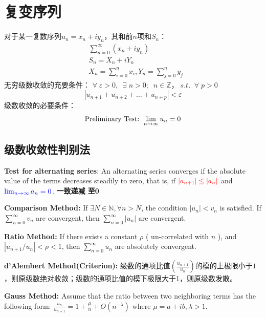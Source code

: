 \documentclass[10pt, a4paper, oneside]{ctexbook}
\begin{document}
\chapter{复变序列}
对于某一复数序列$u_n=x_n+iy_n$，其和前$n$项和$S_n$：
\begin{equation*}
    \begin{aligned}
         & \sum_{n=0}^{\infty}\left(x_{n}+i y_{n}\right)          \\
         & S_{n}=X_{n}+i Y_{n}                                    \\
         & X_{n}=\sum_{i=0}^{n} x_{i}, Y_{n}=\sum_{j=0}^{n} y_{j}
    \end{aligned}
\end{equation*}
无穷级数收敛的充要条件：
$\forall\; \varepsilon > 0,\;\; \exists\; n>0;\;\; n \in \mathbb{Z}， \; s.t.\;\; \forall \; p>0\:$
\begin{equation*}
    \left|u_{n+1}+u_{n+2}+\ldots+u_{n+p}\right|<\varepsilon
\end{equation*}
级数收敛的必要条件：
\begin{equation*}
    \text{\boldmath Preliminary Test: } \lim_{n\to \infty} u_n = 0
\end{equation*}
\section{级数收敛性判别法}
\textbf{Test for alternating series}: An alternating series converges if the absolute value of the terms decreases steadily to zero, that is, if $\color{red} \left|a_{n+1}\right| \leq\left|a_{n}\right|$ and $\color{blue} \lim _{n \rightarrow \infty} a_{n}=0$.
\textbf{\color{red} 一致递减 \color{blue}至0}

\textbf{Comparison Method: }If $\exists N \in \mathbb{N}, \forall n>N$, the condition $\left|u_{n}\right|<v_{n}$ is satisfied. If $\displaystyle \sum_{n=0}^{\infty} v_{n}$ are convergent, then $\displaystyle \sum_{n=0}^{\infty}\left|u_{n}\right|$ are convergent.

\textbf{Ratio Method: }If there exists a constant $\rho$ ({\color{red} un-correlated with $n$ }), and $\left|u_{n+1} / u_{n}\right|<\rho<1$, then $\displaystyle \sum_{n=0}^{\infty} u_{n}$ are absolutely convergent.

\textbf{d'Alembert Method(Criterion): }级数的通项比值$\left(\displaystyle \frac{u_{n+1}}{u_n}\right)$的{\color{red}模}的上极限小于$1$，则原级数绝对收敛；级数的通项比值的模下极限大于1，则原级数发散。

\textbf{Gauss Method: }Assume that the ratio between two neighboring terms has the following form: $\displaystyle \frac{u_{n}}{u_{n+1}}=1+\frac{\mu}{n}+O\left(n^{-\lambda}\right)$
where $\mu=a+i b, \lambda>1$.
\end{document}

